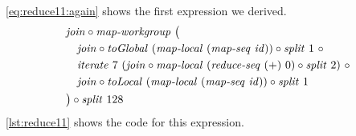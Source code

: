 \autoref{eq:reduce11:again} shows the first expression we derived.
\begin{align}
  \begin{aligned}
    &\join \circ \mapWorkgroup\ \big(\\
    &\quad \join \circ \toGlobal\ (\mapLocal\ (\mapSeq\ \id)) \circ \splitN\ 1\ \circ\\
    &\quad \iterateN\ 7\ (\join \circ \mapLocal\ (\reduceSeq\ (+)\ 0) \circ \splitN\ 2)\ \circ\\
    &\quad \join \circ \toLocal\ (\mapLocal\ (\mapSeq\ \id)) \circ \splitN\ 1\\
    &\big) \circ \splitN\ 128
  \end{aligned}
  \label{eq:reduce11:again}
\end{align}
\autoref{lst:reduce11} shows the \OpenCL code  for this expression.
%

